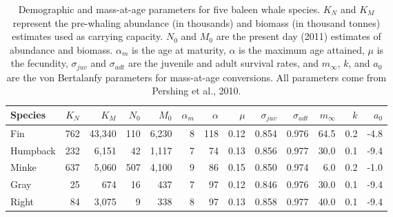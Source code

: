\begin{table}

\caption{\label{tab:species_params}Demographic and mass-at-age parameters for five baleen whale species. $K_N$ and $K_M$ represent the pre-whaling abundance (in thousands) and biomass (in thousand tonnes) estimates used as carrying capacity. $N_0$ and $M_0$ are the present day (2011) estimates of abundance and biomass. $\alpha_m$ is the age at maturity, $\alpha$ is the maximum age attained, $\mu$ is the fecundity, $\sigma_{juv}$ and $\sigma_{adt}$ are the juvenile and adult survival rates, and $m_\infty$, $k$, and $a_0$ are the von Bertalanfy parameters for mass-at-age conversions. All parameters come from Pershing et al., 2010.}
\centering
\begin{tabular}[t]{lrrrrrrrrrrrr}
\toprule
Species & $K_N$ & $K_M$ & $N_0$ & $M_0$ & $\alpha_m$ & $\alpha$ & $\mu$ & $\sigma_{juv}$ & $\sigma_{adt}$ & $m_\infty$ & $k$ & $a_0$\\
\midrule
Fin & 762 & 43,340 & 110 & 6,230 & 8 & 118 & 0.12 & 0.854 & 0.976 & 64.5 & 0.2 & -4.8\\
Humpback & 232 & 6,151 & 42 & 1,117 & 7 & 74 & 0.13 & 0.856 & 0.977 & 30.0 & 0.1 & -9.4\\
Minke & 637 & 5,060 & 507 & 4,100 & 9 & 86 & 0.15 & 0.850 & 0.974 & 6.0 & 0.2 & -1.0\\
Gray & 25 & 674 & 16 & 437 & 7 & 97 & 0.12 & 0.846 & 0.976 & 30.0 & 0.1 & -9.4\\
Right & 84 & 3,075 & 9 & 338 & 8 & 97 & 0.13 & 0.858 & 0.977 & 40.0 & 0.1 & -9.4\\
\bottomrule
\end{tabular}
\end{table}